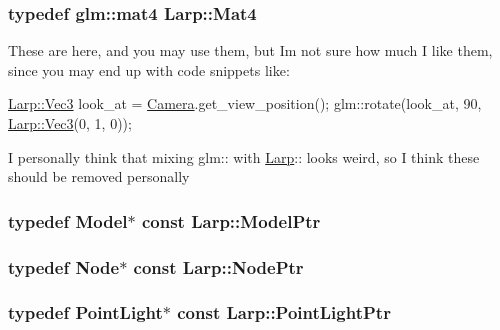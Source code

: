 \subsubsection[{\texorpdfstring{Mat4}{Mat4}}]{\setlength{\rightskip}{0pt plus 5cm}typedef glm\+::mat4 {\bf Larp\+::\+Mat4}}\hypertarget{namespaceLarp_af9602e8b75abbefde183900a720429f6}{}\label{namespaceLarp_af9602e8b75abbefde183900a720429f6}
These are here, and you may use them, but I\textquotesingle{}m not sure how much I like them, since you may end up with code snippets like\+:


\begin{DoxyCode}
\hyperlink{namespaceLarp_a477b379311661e072acd751be3d473aa}{Larp::Vec3} look\_at = \hyperlink{classCamera}{Camera}.get\_view\_position();
glm::rotate(look\_at, 90, \hyperlink{namespaceLarp_a477b379311661e072acd751be3d473aa}{Larp::Vec3}(0, 1, 0));
\end{DoxyCode}


I personally think that mixing glm\+:\+: with \hyperlink{namespaceLarp}{Larp}\+:\+: looks weird, so I think these should be removed personally 
\subsubsection[{\texorpdfstring{Model\+Ptr}{ModelPtr}}]{\setlength{\rightskip}{0pt plus 5cm}typedef {\bf Model}$\ast$ const {\bf Larp\+::\+Model\+Ptr}}\hypertarget{namespaceLarp_a1fbc1dec59f7a571dc06e152b1e7d38c}{}\label{namespaceLarp_a1fbc1dec59f7a571dc06e152b1e7d38c}
\subsubsection[{\texorpdfstring{Node\+Ptr}{NodePtr}}]{\setlength{\rightskip}{0pt plus 5cm}typedef {\bf Node}$\ast$ const {\bf Larp\+::\+Node\+Ptr}}\hypertarget{namespaceLarp_a171c1dc8b70cfb441b15d7386780db23}{}\label{namespaceLarp_a171c1dc8b70cfb441b15d7386780db23}
\subsubsection[{\texorpdfstring{Point\+Light\+Ptr}{PointLightPtr}}]{\setlength{\rightskip}{0pt plus 5cm}typedef {\bf Point\+Light}$\ast$ const {\bf Larp\+::\+Point\+Light\+Ptr}}\hypertarget{namespaceLarp_a07215808e8e3c5229ca8549c5450e3e5}{}\label{namespaceLarp_a07215808e8e3c5229ca8549c5450e3e5}

